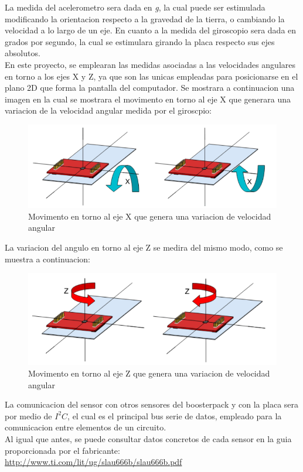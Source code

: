 \documentclass[a4paper,twoside]{article}
\begin{document}
La medida del acelerometro sera dada en \textit{g}, la cual puede ser estimulada modificando la orientacion respecto a la gravedad de la tierra, o cambiando la velocidad a lo largo de un eje. En cuanto a la medida del giroscopio sera dada en grados por segundo, la cual se estimulara girando la placa respecto sus ejes absolutos. \\
En este proyecto, se emplearan las medidas asociadas a las velocidades angulares en torno a los ejes X y Z, ya que son las unicas empleadas para posicionarse en el plano 2D que forma la pantalla del computador. Se mostrara a continuacion una imagen en la cual se mostrara el movimento en torno al eje X que generara una variacion de la velocidad angular medida por el giroscpio:\\
\begin{figure}[h!]
 \centering
 \includegraphics[width=.6\textwidth]{../images/mov_axisX_bmi}
 \caption{Movimento en torno al eje X que genera una variacion de velocidad angular}
\end{figure}

La variacion del angulo en torno al eje Z se medira del mismo modo, como se muestra a continuacion: \\
\begin{figure}[h!]
 \centering
 \includegraphics[width=.6\textwidth]{../images/mov_axisZ_bmi}
 \caption{Movimento en torno al eje Z que genera una variacion de velocidad angular}
\end{figure}

\newpage
La comunicacion del sensor con otros sensores del boosterpack y con la placa sera por medio de $I^2C$, el cual es el principal bus serie de datos, empleado para la comunicacion entre elementos de un circuito. \\

Al igual que antes, se puede consultar datos concretos de cada sensor en la guia proporcionada por el fabricante:
\url{http://www.ti.com/lit/ug/slau666b/slau666b.pdf}
\end{document}
